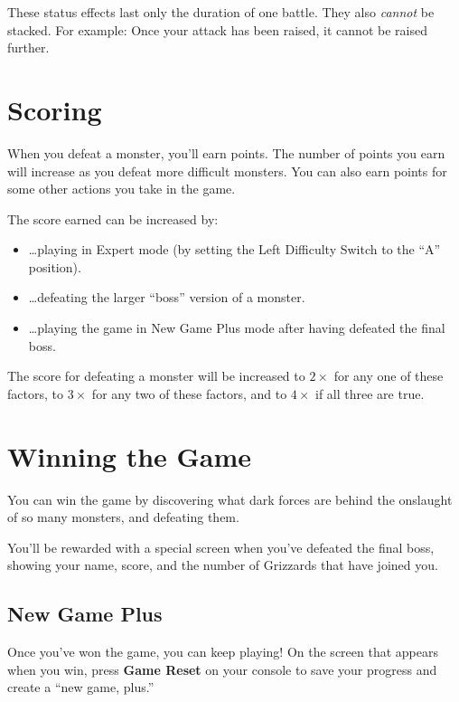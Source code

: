 \documentclass[9pt,twocolumn,openany,article]{memoir}
\newenvironment{ritemize}{\begin{itemize}\raggedright}{\end{itemize}}
\begin{document}
These status  effects last only  the duration  of one battle.  They also
\emph{cannot} be stacked. For example: Once your attack has been raised,
it cannot be raised further.

\section{Scoring}

When you defeat a monster, you'll  earn points. The number of points you
earn will increase  as you defeat more difficult monsters.  You can also
earn points for some other actions you take in the game.

The score earned can be increased by:

\begin{ritemize}
\item \ldots{}playing  in Expert  mode (by  setting the  Left Difficulty
  Switch to the ``A'' position).
\item \ldots{}defeating the larger ``boss'' version of a monster.
\item  \ldots{}playing the  game  in  New Game  Plus  mode after  having
  defeated the final boss.
\end{ritemize}

The score for  defeating a monster will be increased  to $2\times$ for any
one of these  factors, to $3\times$ for  any two of these  factors, and to
$4\times$ if all three are true.

\section{Winning the Game}

You can  win the  game by  discovering what dark  forces are  behind the
onslaught of so many monsters, and defeating them.

You'll  be rewarded  with  a  special screen  when  you've defeated  the
final boss, showing  your name, score, and the number  of Grizzards that
have joined you.

\subsection*{New Game Plus}\label{sec:NewGamePlus}

Once  you've won  the game,  you can  keep playing!  On the  screen that
appears when you win, press \textbf{Game  Reset} on your console to save
your progress and create a ``new game, plus.''
\end{document}
